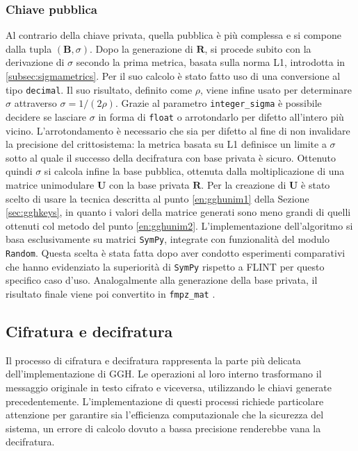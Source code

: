 \subsubsection{Chiave pubblica}
Al contrario della chiave privata, quella pubblica è più complessa e si compone dalla tupla
$(\mathbf{B}, \sigma)$.
Dopo la generazione di $\mathbf{R}$, si procede subito con la derivazione di $\sigma$ secondo 
la prima metrica, basata sulla norma L1, introdotta in \ref{subsec:sigmametrics}. 
Per il suo calcolo 
è stato fatto uso di una conversione al tipo \texttt{decimal}. Il suo risultato, 
definito come $\rho$, viene infine usato per determinare $\sigma$ attraverso 
$\sigma = 1 / (2\rho)$. Grazie al parametro \texttt{integer\_sigma} è possibile decidere
se lasciare $\sigma$ in forma di \texttt{float} o arrotondarlo per difetto all'intero più vicino.
L'arrotondamento è necessario che sia per difetto al fine di non invalidare la precisione 
del crittosistema: la metrica basata su L1 definisce un limite a $\sigma$ sotto al quale
il successo della decifratura con base privata è sicuro. Ottenuto quindi $\sigma$ si calcola infine
la base pubblica, ottenuta dalla moltiplicazione di una matrice unimodulare $\mathbf{U}$ con
la base privata $\mathbf{R}$. Per la creazione di $\mathbf{U}$ è stato scelto di usare
la tecnica descritta al punto \ref{en:gghunim1} della Sezione \ref{sec:gghkeys}, in quanto
i valori della matrice generati sono meno grandi di quelli ottenuti col metodo del punto
\ref{en:gghunim2}.
L'implementazione dell'algoritmo si basa esclusivamente su matrici \texttt{SymPy}, integrate 
con funzionalità del modulo \texttt{Random}. Questa scelta è stata fatta dopo aver condotto 
esperimenti comparativi che hanno evidenziato la superiorità di \texttt{SymPy} rispetto a FLINT 
per questo specifico caso d'uso. Analogalmente alla generazione della base privata,
il risultato finale viene poi convertito in \texttt{fmpz\_mat} .

\subsection{Cifratura e decifratura}

Il processo di cifratura e decifratura rappresenta la parte più delicata dell'implementazione di GGH.
Le operazioni al loro interno trasformano il messaggio originale in testo cifrato e viceversa, 
utilizzando le chiavi generate precedentemente. L'implementazione di questi processi 
richiede particolare attenzione per garantire sia l'efficienza computazionale che la 
sicurezza del sistema, un errore di calcolo dovuto a bassa precisione renderebbe vana 
la decifratura.

